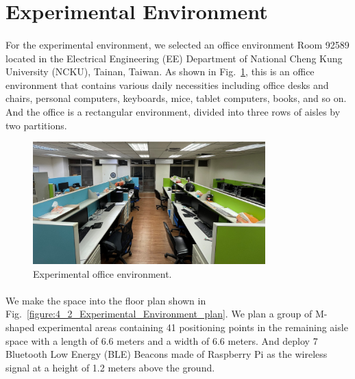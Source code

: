 \documentclass[a4paper,12pt]{report}
\begin{document}
\section{Experimental Environment}

\paragraph{}
For the experimental environment, we selected an office environment Room 92589 located in the Electrical Engineering (EE) Department of National Cheng Kung University (NCKU), Tainan, Taiwan. As shown in Fig.~\ref{figure:4_2_Experimental_Environment_picture}, this is an office environment that contains various daily necessities including office desks and chairs, personal computers, keyboards, mice, tablet computers, books, and so on. And the office is a rectangular environment, divided into three rows of aisles by two partitions.

\begin{figure}[tbph]
    \begin{center}
    \includegraphics[width=0.8\textwidth]{images/4_2_Experimental_Environment_picture.jpg}
    \caption{Experimental office environment.}
    \label{figure:4_2_Experimental_Environment_picture}
    \end{center}
\end{figure}

\paragraph{}
We make the space into the floor plan shown in Fig.~\ref{figure:4_2_Experimental_Environment_plan}. We plan a group of M-shaped experimental areas containing 41 positioning points in the remaining aisle space with a length of 6.6 meters and a width of 6.6 meters. And deploy 7 Bluetooth Low Energy (BLE) Beacons made of Raspberry Pi as the wireless signal at a height of 1.2 meters above the ground.
%
\end{document}

